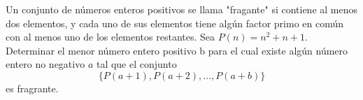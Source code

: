 Un conjunto de números enteros positivos se llama "fragante" si contiene al menos dos elementos, y cada uno de sus elementos tiene algún factor primo en común con al menos uno de los elementos restantes. Sea $P (n) = n^2 + n + 1$. Determinar el menor número entero positivo b para el cual existe algún número entero no negativo $a$ tal que el conjunto
\[\{P(a+1),P(a+2),\dots,P(a+b)\}\]
es fragrante.